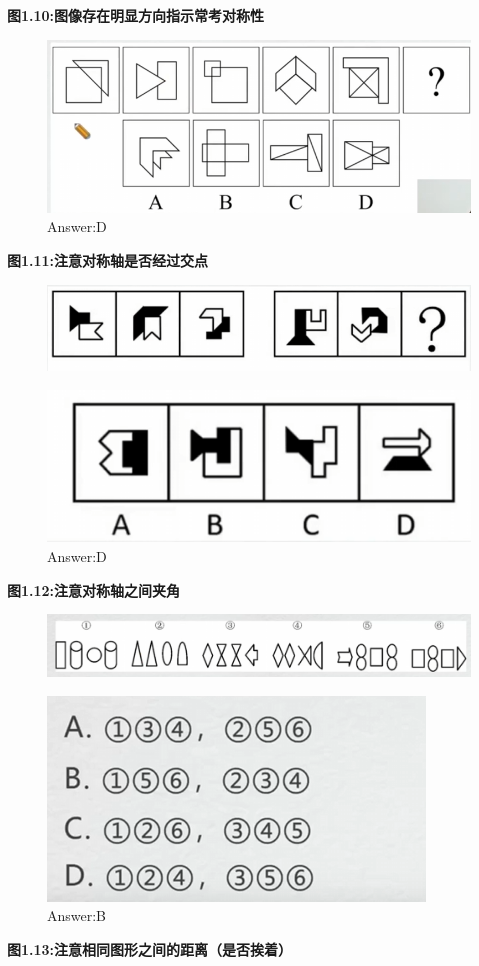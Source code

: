\documentclass{article}
\numberwithin{equation}{section}						%
\numberwithin{figure}{section}							%
\begin{document}
\begin{sloppypar}
\textbf{图1.10:图像存在明显方向指示常考对称性}


\begin{figure}[H]
     \centering
     \includegraphics[width=0.5\linewidth]{12.png}
		\caption{Answer:D}
 \end{figure}

\textbf{图1.11:注意对称轴是否经过交点}

\begin{figure}[H]
     \centering
     \includegraphics[width=0.5\linewidth]{13.png}
 \end{figure}

\begin{figure}[H]
     \centering
     \includegraphics[width=0.3\linewidth]{14.png}
		\caption{Answer:D}
 \end{figure}

\textbf{图1.12:注意对称轴之间夹角}

\begin{figure}[H]
     \centering
     \includegraphics[width=0.65\linewidth]{15.png}
 \end{figure}

\begin{figure}[H]
     \centering
     \includegraphics[width=0.25\linewidth]{16.png}
		\caption{Answer:B}
 \end{figure}

\textbf{图1.13:注意相同图形之间的距离（是否挨着）}


\end{sloppypar}
\end{document}
